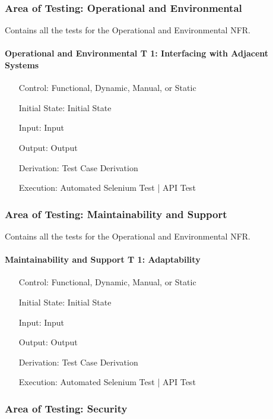 \documentclass[12pt, titlepage]{article}
\begin{document}
\subsubsection{Area of Testing: Operational and Environmental}

Contains all the tests for the Operational and Environmental NFR.

\paragraph*{Operational and Environmental T 1: Interfacing with Adjacent Systems}
\begin{itemize}
	\item[Control:] Functional, Dynamic, Manual, or Static
	\item[Initial State:] Initial State
	\item[Input:] Input
	\item[Output:] Output
	\item[Derivation:] Test Case Derivation
	\item[Execution:] Automated Selenium Test | API Test
\end{itemize}

\subsubsection{Area of Testing: Maintainability and Support}

Contains all the tests for the Operational and Environmental NFR.

\paragraph*{Maintainability and Support T 1: Adaptability}
\begin{itemize}
	\item[Control:] Functional, Dynamic, Manual, or Static
	\item[Initial State:] Initial State
	\item[Input:] Input
	\item[Output:] Output
	\item[Derivation:] Test Case Derivation
	\item[Execution:] Automated Selenium Test | API Test
\end{itemize}

\subsubsection{Area of Testing: Security}
\end{document}

